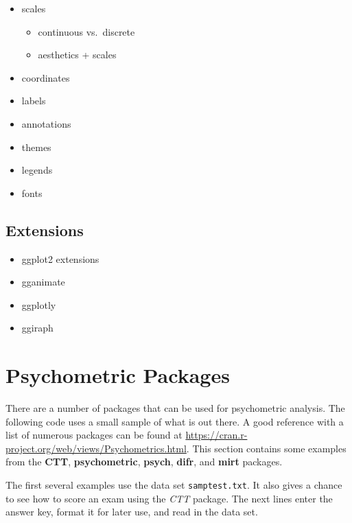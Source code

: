 \documentclass[
]{book}
\providecommand{\tightlist}{%
  \setlength{\itemsep}{0pt}\setlength{\parskip}{0pt}}
\begin{document}
\begin{itemize}
\tightlist
\item
  scales

  \begin{itemize}
  \tightlist
  \item
    continuous vs.~discrete
  \item
    aesthetics + scales
  \end{itemize}
\item
  coordinates
\item
  labels
\item
  annotations
\item
  themes
\item
  legends
\item
  fonts
\end{itemize}

\hypertarget{extensions-1}{%
\section{Extensions}\label{extensions-1}}

\begin{itemize}
\tightlist
\item
  ggplot2 extensions
\item
  gganimate
\item
  ggplotly
\item
  ggiraph
\end{itemize}

\hypertarget{psychometric-packages}{%
\chapter{Psychometric Packages}\label{psychometric-packages}}

There are a number of packages that can be used for psychometric analysis. The following code uses a small sample of what is out there. A good reference with a list of numerous packages can be found at \url{https://cran.r-project.org/web/views/Psychometrics.html}. This section contains some examples from the \textbf{CTT}, \textbf{psychometric}, \textbf{psych}, \textbf{difr}, and \textbf{mirt} packages.

The first several examples use the data set \texttt{samptest.txt}. It also gives a chance to see how to score an exam using the \emph{CTT} package. The next lines enter the answer key, format it for later use, and read in the data set.
\end{document}
